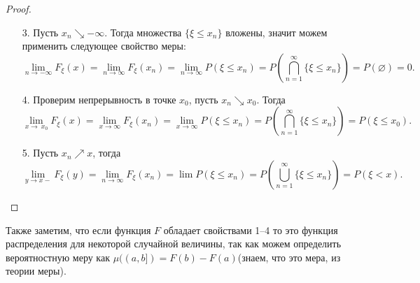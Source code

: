 \begin{proof}
\enewline
   \begin{enumerate}
   \item[3.] Пусть $x_n\searrow -\infty$. Тогда множества $\{\xi \le x_n\}$ вложены, значит можем применить следующее свойство меры:
   $$\lim_{n\rightarrow -\infty} F_\xi (x) = \lim_{n \to \infty} F_{\xi}(x_n) = \underset{n\rightarrow \infty}{\lim} P(\xi\le x_n) = P \left(\overset{\infty}{\underset{n = 1}{\bigcap}} \{\xi\le x_n\}\right) = P(\varnothing) = 0.$$
   \item[4.]Проверим непрерывность в точке $x_0$, пусть $x_n\searrow x_0$.
                  Тогда 
                  $$\lim_{x \to \ x_0} F_\xi(x) = \underset{x\rightarrow\infty}{\lim} F_\xi (x_n)= \underset{x\rightarrow\infty}{\lim} P(\xi \le x_n) =
                      P\left(\overset{\infty}{\underset{n = 1}{\bigcap}} \{ \xi\le x_n\}\right) = P(\xi\le x_0).$$
   \item[5.] Пусть $x_n \nearrow x$, тогда
   $$\lim_{y\rightarrow x-} F_\xi(y)= \lim_{n \to \infty} F_\xi(x_n) = \lim P(\xi\le x_n) = P\left(\overset{\infty}{\underset{n = 1}{\bigcup}} \{\xi\le x_n\}\right) = P(\xi < x).$$ \qedhere
   \end{enumerate}
\end{proof}
   
   Также заметим, что если функция $F$ обладает свойствами 1--4 то это функция распределения для некоторой случайной величины, так как можем определить вероятностную меру как $\mu((a, b]) = F(b) - F(a)$(знаем, что это мера, из теории меры).

